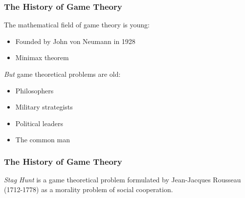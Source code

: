 \documentclass{beamer}
\begin{document}
\begin{frame}
 
\frametitle{The History of Game Theory}

The mathematical field of game theory is young:

\begin{itemize}
\item Founded by John von Neumann in 1928
  \item Minimax theorem
\end{itemize}

\emph{But} game theoretical problems are old:

\begin{itemize}
\item Philosophers
\item Military strategists
\item Political leaders
\item The common man
\end{itemize}

\end{frame}

\begin{frame}
  
\frametitle{The History of Game Theory}

\emph{Stag Hunt} is a game theoretical problem formulated by Jean-Jacques Rousseau (1712-1778) as a morality problem
of social cooperation.

\begin{table}
  \centering
  \setlength{\extrarowheight}{2pt}
\end{table}


\end{frame}
\end{document}
